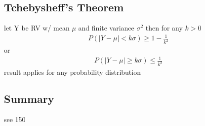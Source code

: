 \documentclass[12pt]{article}
\begin{document}
    \subsection{Tchebysheff's Theorem}
        let Y be RV w/ mean $ \mu  $ and finite variance $ \sigma ^2  $
        then for any $ k >0 $
        \begin{align*}
            P(|Y-\mu | < k\sigma ) \ge 1 - \frac{1}{k^2 }
        \end{align*}
        or
        \begin{align*}
            P(|Y-\mu | \ge k\sigma ) \le \frac{1}{k^2 }
        \end{align*}
        result applies for any probability distribution
\subsection{Summary}
    see 150
\end{document}
